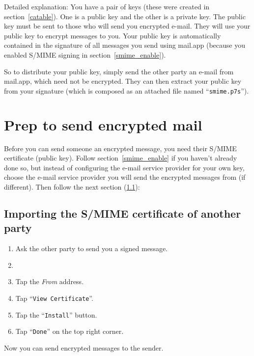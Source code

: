 \documentclass[pdftex,12pt,titlepage=false]{scrartcl}
\begin{document}
Detailed explanation: You have a pair of keys (these were created in
section~\ref{catable}).  One is a public key and the other is a
private key.  The public key must be sent to those who will send you
encrypted e-mail.  They will use your public key to encrypt messages
to you.  Your public key is automatically contained in the signature
of all messages you send using mail.app (because you enabled S/MIME
signing in section~\ref{smime_enable}).

So to distribute your public key, simply send the other party an
e-mail from mail.app, which need not be encrypted.  They can then
extract your public key from your signature (which is composed as an
attached file named ``\verb|smime.p7s|'').

\section{Prep to send encrypted mail%
}
Before you can send someone an encrypted message, you need their
S/MIME certificate (public key).  Follow section~\ref{smime_enable} if
you haven't already done so, but instead of configuring the e-mail
service provider for your own key, choose the e-mail service provider
you will send the encrypted messages from (if different).  Then follow
the next section (\ref{import_cert}):

\subsection{Importing the S/MIME certificate of another
  party}\label{import_cert}
\begin{enumerate}
\item Ask the other party to send you a signed message.
\item {}
\item Tap the \emph{From} address.
\item Tap ``\verb|View Certificate|''.
\item Tap the ``\verb|Install|'' button.
\item Tap ``\verb|Done|'' on the top right corner.
\end{enumerate}

Now you can send encrypted messages to the sender.
\end{document}
